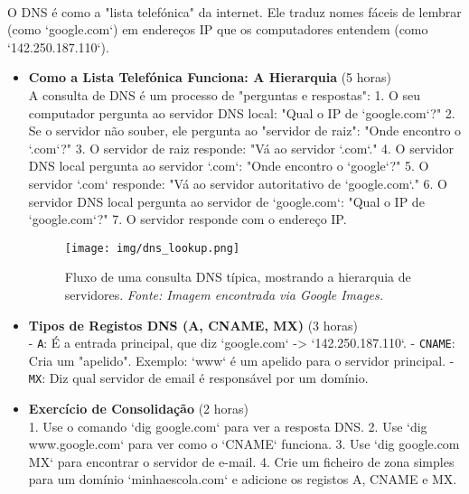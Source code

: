 \documentclass[10pt,a4paper]{article}
\begin{document}
	\paragraph{}
	O DNS é como a "lista telefónica" da internet. Ele traduz nomes fáceis de lembrar (como `google.com`) em endereços IP que os computadores entendem (como `142.250.187.110`).
	
	\begin{itemize}
		\item \textbf{Como a Lista Telefónica Funciona: A Hierarquia} (5 horas) \\
		A consulta de DNS é um processo de "perguntas e respostas":
		1.  O seu computador pergunta ao servidor DNS local: "Qual o IP de `google.com`?"
		2.  Se o servidor não souber, ele pergunta ao "servidor de raiz": "Onde encontro o `.com`?"
		3.  O servidor de raiz responde: "Vá ao servidor `.com`."
		4.  O servidor DNS local pergunta ao servidor `.com`: "Onde encontro o `google`?"
		5.  O servidor `.com` responde: "Vá ao servidor autoritativo de `google.com`."
		6.  O servidor DNS local pergunta ao servidor de `google.com`: "Qual o IP de `google.com`?"
		7.  O servidor responde com o endereço IP.
		
		\begin{figure}[h]
			\centering
			\texttt{[image: img/dns\_lookup.png]}
			\caption{Fluxo de uma consulta DNS típica, mostrando a hierarquia de servidores. \textit{Fonte: Imagem encontrada via Google Images.}}
			\label{fig:dns_lookup}
		\end{figure}
		
		\item \textbf{Tipos de Registos DNS (A, CNAME, MX)} (3 horas) \\
		- \texttt{A}: É a entrada principal, que diz `google.com` -> `142.250.187.110`.
		- \texttt{CNAME}: Cria um "apelido". Exemplo: `www` é um apelido para o servidor principal.
		- \texttt{MX}: Diz qual servidor de email é responsável por um domínio.
		
		\item \textbf{Exercício de Consolidação} (2 horas) \\
		1. Use o comando `dig google.com` para ver a resposta DNS.
		2. Use `dig www.google.com` para ver como o `CNAME` funciona.
		3. Use `dig google.com MX` para encontrar o servidor de e-mail.
		4. Crie um ficheiro de zona simples para um domínio `minhaescola.com` e adicione os registos A, CNAME e MX.
	\end{itemize}
	
\end{document}
